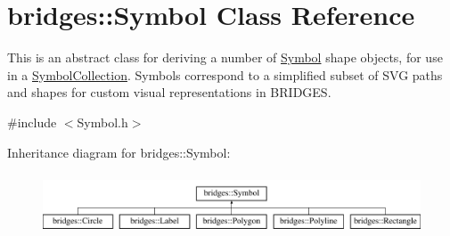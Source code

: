 \hypertarget{classbridges_1_1_symbol}{}\section{bridges\+::Symbol Class Reference}
\label{classbridges_1_1_symbol}


This is an abstract class for deriving a number of \mbox{\hyperlink{classbridges_1_1_symbol}{Symbol}} shape objects, for use in a \mbox{\hyperlink{classbridges_1_1_symbol_collection}{Symbol\+Collection}}. Symbols correspond to a simplified subset of S\+VG paths and shapes for custom visual representations in B\+R\+I\+D\+G\+ES.  




{\ttfamily \#include $<$Symbol.\+h$>$}

Inheritance diagram for bridges\+::Symbol\+:\begin{figure}[H]
\begin{center}
\leavevmode
\includegraphics[height=1.806452cm]{classbridges_1_1_symbol}
\end{center}
\end{figure}
